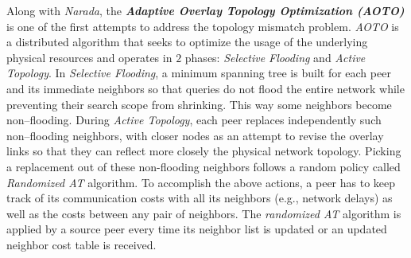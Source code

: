 
Along with \emph{Narada}, the \textbf{\emph{Adaptive Overlay Topology 
Optimization (AOTO)}} \cite{LZXN2003} is one of the first attempts to address the
topology mismatch problem. \emph{AOTO} is a distributed algorithm that seeks to
optimize the usage of the underlying physical resources and operates in
$2$ phases:
\emph{Selective Flooding} and \emph{Active Topology}.
In \emph{Selective Flooding}, a minimum spanning tree is built for each peer and
its immediate neighbors so that queries do not flood the entire network 
while preventing their search scope from shrinking. This way some
neighbors become non--flooding. During \emph{Active Topology}, each peer
replaces independently such non--flooding neighbors, with closer nodes as an attempt
to revise the overlay links so that they can reflect more closely the physical
network topology. Picking a replacement out of these non-flooding
neighbors follows a random policy called \emph{Randomized AT} algorithm.
To accomplish the above actions, a peer has to keep track of 
its communication costs with all its neighbors (e.g., network delays)
as well as the costs between any pair of neighbors. The \emph{randomized AT}
algorithm is applied by a source peer
every time its neighbor list is updated or an updated neighbor cost 
table is received.
%
%
